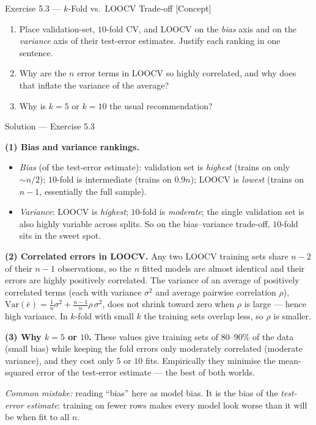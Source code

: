 \documentclass[aspectratio=169,11pt]{beamer}
\begin{document}
\begin{frame}{Exercise 5.3 --- $k$-Fold vs.\ LOOCV Trade-off [Concept]}
  \begin{exercise}
    \begin{enumerate}
      \item Place validation-set, $10$-fold CV, and LOOCV on the
            \emph{bias} axis and on the \emph{variance} axis of their
            test-error estimates. Justify each ranking in one sentence.
      \item Why are the $n$ error terms in LOOCV so highly correlated,
            and why does that inflate the variance of the average?
      \item Why is $k = 5$ or $k = 10$ the usual recommendation?
    \end{enumerate}
  \end{exercise}
\end{frame}

\begin{frame}{Solution --- Exercise 5.3}
  \begin{solutionbox}
    \scriptsize
    \textbf{(1) Bias and variance rankings.}
    \begin{itemize}
      \item \emph{Bias} (of the test-error estimate): validation set is
            \emph{highest} (trains on only $\sim n/2$); $10$-fold is
            intermediate (trains on $0.9n$); LOOCV is \emph{lowest}
            (trains on $n-1$, essentially the full sample).
      \item \emph{Variance}: LOOCV is \emph{highest}; $10$-fold is
            \emph{moderate}; the single validation set is also highly
            variable across splits. So on the bias--variance trade-off,
            $10$-fold sits in the sweet spot.
    \end{itemize}
    \textbf{(2) Correlated errors in LOOCV.}
    Any two LOOCV training sets share $n-2$ of their $n-1$ observations,
    so the $n$ fitted models are almost identical and their errors are
    highly positively correlated. The variance of an average of
    positively correlated terms (each with variance $\sigma^2$ and average
    pairwise correlation $\rho$),
    $\mathrm{Var}(\bar e) = \tfrac{1}{n}\sigma^2 +
    \tfrac{n-1}{n}\rho\,\sigma^2$, does not shrink toward zero when
    $\rho$ is large --- hence high variance. In $k$-fold with small $k$
    the training sets overlap less, so $\rho$ is smaller.

    \textbf{(3) Why $k = 5$ or $10$.}
    These values give training sets of $80$--$90\%$ of the data (small
    bias) while keeping the fold errors only moderately correlated
    (moderate variance), and they cost only $5$ or $10$ fits. Empirically
    they minimise the mean-squared error of the test-error estimate ---
    the best of both worlds.

    \smallskip
    \textit{Common mistake:} reading ``bias'' here as model bias. It is
    the bias of the \emph{test-error estimate}: training on fewer rows
    makes every model look worse than it will be when fit to all $n$.
  \end{solutionbox}
\end{frame}
\end{document}
